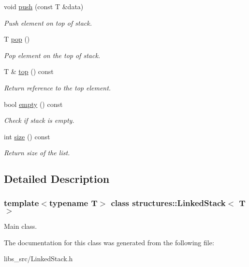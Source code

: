 \begin{DoxyCompactItemize}
void \mbox{\hyperlink{classstructures_1_1_linked_stack_adb8c6b231298ac25b17ba692d510a3fc}{push}} (const T \&data)
\begin{DoxyCompactList}\small\item\em Push element on top of stack. \end{DoxyCompactList}\item 
\mbox{\label{classstructures_1_1_linked_stack_a8ff0ba0de594ec26971bb259e1d28c3c}} 
T \mbox{\hyperlink{classstructures_1_1_linked_stack_a8ff0ba0de594ec26971bb259e1d28c3c}{pop}} ()
\begin{DoxyCompactList}\small\item\em Pop element on the top of stack. \end{DoxyCompactList}\item 
\mbox{\label{classstructures_1_1_linked_stack_aad15dbec751c5529fce5daa60485867d}} 
T \& \mbox{\hyperlink{classstructures_1_1_linked_stack_aad15dbec751c5529fce5daa60485867d}{top}} () const
\begin{DoxyCompactList}\small\item\em Return reference to the top element. \end{DoxyCompactList}\item 
\mbox{\label{classstructures_1_1_linked_stack_ac9704fd697f9c4ed4f7fc4e786114e4f}} 
bool \mbox{\hyperlink{classstructures_1_1_linked_stack_ac9704fd697f9c4ed4f7fc4e786114e4f}{empty}} () const
\begin{DoxyCompactList}\small\item\em Check if stack is empty. \end{DoxyCompactList}\item 
\mbox{\label{classstructures_1_1_linked_stack_a8d71e1e5715f9a04b6e9e2eb90140546}} 
int \mbox{\hyperlink{classstructures_1_1_linked_stack_a8d71e1e5715f9a04b6e9e2eb90140546}{size}} () const
\begin{DoxyCompactList}\small\item\em Return size of the list. \end{DoxyCompactList}\end{DoxyCompactItemize}


\subsection{Detailed Description}
\subsubsection*{template$<$typename T$>$\newline
class structures\+::\+Linked\+Stack$<$ T $>$}

Main class. 

The documentation for this class was generated from the following file\+:\begin{DoxyCompactItemize}
\item 
libs\+\_\+src/Linked\+Stack.\+h\end{DoxyCompactItemize}

